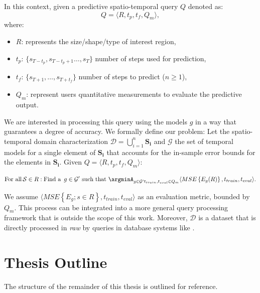 In this context, given a predictive spatio-temporal query $Q$ denoted as:
\begin{equation} \label{eq:predictivequery}
Q = \langle R, t_{p}, t_{f}, Q_{m} \rangle,
\end{equation}
where:
\begin{itemize}[noitemsep,nolistsep]	
	\item $R$: represents the size/shape/type of interest region,
	\item $t_{p}$: $\{s_{T-t_p}, s_{T-t_{p}+1}\ldots, s_{T}\}$ number of steps used for prediction,
	\item $t_{f}$: $\{s_{T+1}, \ldots, s_{T+t_f}\}$ number of steps to predict ($n\geq 1$),
	\item $Q_{m}$: represent users quantitative measurements to evaluate the predictive output.
\end{itemize}
We are interested in processing this query using the models $g$ in a way that guarantees a degree of accuracy. We formally define our problem: Let the spatio-temporal domain characterization $\mathcal{D} = \bigcup_{i=1}^{n} \mathbf{S_i}$ and $\mathcal{G}$ the set of temporal models for a single element of $\mathbf{S_i}$ that accounts for the in-sample error bounds for the elements in $\mathbf{S_i}$. Given $Q = \langle R, t_{p}, t_{f}, Q_{m} \rangle$:

\begin{equation}
\textrm{For all}\, \mathcal{S} \in R: \textrm{Find a\, } g \in \mathcal{G'} \,\,\textrm{such that} \,\, \argminA_{g\in\mathcal{G'}\\t_{train}, t_{eval} \in Q_{m}} \langle MSE \left\{E_{g}(R)\right\}, t_{train}, t_{eval}\rangle .
\end{equation}

We assume $\langle MSE\left\{E_{g}; \mathit{s}\in R\right\}, t_{train}, t_{eval}\rangle$ as an evaluation metric, bounded by $Q_{m}$. This process can be integrated into a more general query processing framework that is outside the scope of this work. Moreover,  $\mathcal{D}$ is a dataset that is directly processed in \emph{raw} by queries in database systems like \cite{Karpathiotakis2014, Lustosa2020}. 


\section{Thesis Outline}
\label{Sec:ThesisOutline}

The structure of the remainder of this thesis is outlined for reference.

